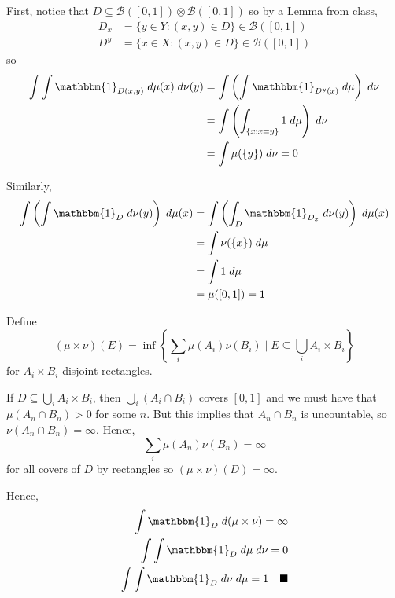 \documentclass[12pt]{article}
\newcommand{\ind}{\mathbbm{1}}
\newcommand{\qed}{\quad \blacksquare}
\newcommand{\B}{\mathcal{B}}
\newcommand{\sub}{\subseteq}
\begin{document}
    \color{blue}
        First, notice that $D \sub \B([0, 1]) \otimes \B([0, 1])$ so by a Lemma from class, 
        \begin{align*}
            D_x &= \{y \in Y: (x, y) \in D\} \in \B([0, 1])\\
            D^y &= \{x \in X: (x, y) \in D\} \in \B([0, 1])
        \end{align*}
        so
        \begin{align*}
            \int \int \ind_{D(x, y)} \; d\mu(x) \; d\nu(y) &= \int \left(\int \ind_{D^y(x)}\; d\mu\right)\; d\nu\\ 
                &= \int \left(\int_{\{x: x = y\}} 1 \; d\mu\right) \; d\nu\\ 
                &= \int \mu(\{y\}) \; d\nu = 0
        \end{align*}

        Similarly,
        \begin{align*}
            \int \left(\int \ind_D \; d\nu(y)\right)\; d\mu(x) &= \int \left(\int_D \ind_{D_x} \; d\nu(y)\right)\; d\mu(x)\\ 
            &= \int \nu(\{x\}) \; d\mu \\
            &= \int 1 \; d\mu\\ 
            &= \mu([0, 1]) = 1
        \end{align*}

        Define 
        \[(\mu \times \nu)(E) = \inf\left\{\sum_i \mu(A_i) \nu(B_i) \; \bigg\vert \; E \sub \bigcup_i A_i \times B_i\right\}\]
        for $A_i \times B_i$ disjoint rectangles. 
        
        If $D \sub \bigcup_i A_i \times B_i$, then $\bigcup_i (A_i \cap B_i)$ covers $[0, 1]$ and we must have that $\mu(A_n \cap B_n) > 0$ for some $n$. But this implies that $A_n \cap B_n$ is uncountable, so $\nu(A_n \cap B_n) = \infty$. Hence,
        \[\sum_i \mu(A_n)\nu(B_n) = \infty \]
        for all covers of $D$ by rectangles so $(\mu \times \nu)(D) = \infty$.

        Hence, 
        \begin{align*}
            \int \ind_D \; d(\mu \times \nu) = \infty\\ 
            \int \int \ind_D \; d\mu \; d\nu = 0\\
            \int \int \ind_D \; d\nu \; d\mu = 1 \qed
        \end{align*}
       
    \color{black}


\pagebreak 
\end{document}
